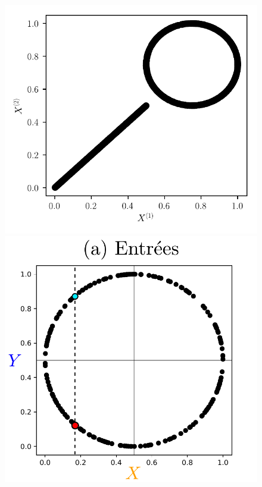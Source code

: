 \begin{figure}
\begin{minipage}{\textwidth}
		\begin{minipage}{0.33\textwidth}
			\includegraphics[width=\textwidth]{2som_mix_in.pdf}
		\end{minipage}
	\end{minipage}
	\begin{minipage}{\textwidth}
		\begin{minipage}{0.33\textwidth}
			\includegraphics[width=\textwidth]{2som_inp_noU.pdf}

\end{minipage}
\end{minipage}
\end{figure}
